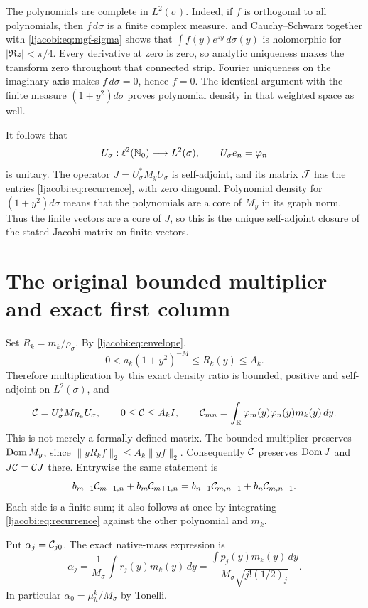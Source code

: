 The polynomials are complete in $L^2(\sigma)$. Indeed, if $f$ is
orthogonal to all polynomials, then $f\,d\sigma$ is a finite complex
measure, and Cauchy--Schwarz together with
\eqref{ljacobi:eq:mgf-sigma} shows that
$\int f(y)e^{zy}\,d\sigma(y)$ is holomorphic for $|\Re z|<\pi/4$.
Every derivative at zero is zero, so analytic uniqueness makes
the transform zero throughout that connected strip. Fourier
uniqueness on the imaginary axis makes $f\,d\sigma=0$, hence $f=0$.
The identical argument with the finite measure $(1+y^2)d\sigma$
proves polynomial density in that weighted space as well.

It follows that
\[
 U_\sigma:\ell^2(\mathbb N_0)\longrightarrow L^2(\sigma),\qquad
 U_\sigma e_n=\varphi_n
\]
is unitary. The operator $J=U_\sigma^*M_yU_\sigma$ is self-adjoint,
and its matrix $\mathcal J$ has the entries \eqref{ljacobi:eq:recurrence}, with zero
diagonal. Polynomial density for $(1+y^2)d\sigma$ means that the
polynomials are a core of $M_y$ in its graph norm. Thus the finite
vectors are a core of $J$, so this is the unique self-adjoint closure
of the stated Jacobi matrix on finite vectors.

\section{The original bounded multiplier and exact first column}

Set $R_k=m_k/\rho_\sigma$. By \eqref{ljacobi:eq:envelope},
\[
 0<a_k(1+y^2)^{-M}\leq R_k(y)\leq A_k.
\]
Therefore multiplication by this exact density ratio is bounded,
positive and self-adjoint on $L^2(\sigma)$, and
\begin{equation}\label{ljacobi:eq:operator}
 \mathcal C=U_\sigma^*M_{R_k}U_\sigma,\qquad
 0\leq\mathcal C\leq A_k I,\qquad
 \mathcal C_{mn}=\int_\mathbb R\varphi_m(y)\varphi_n(y)m_k(y)\,dy.
\end{equation}
This is not merely a formally defined matrix. The bounded multiplier
preserves $\operatorname{Dom} M_y$, since
$\|yR_k f\|_2\leq A_k\|yf\|_2$. Consequently $\mathcal C$ preserves
$\operatorname{Dom} J$ and $J\mathcal C=\mathcal C J$ there. Entrywise the same statement is
\[
 b_{m-1}\mathcal C_{m-1,n}+b_m\mathcal C_{m+1,n}
 =b_{n-1}\mathcal C_{m,n-1}+b_n\mathcal C_{m,n+1}.
\]
Each side is a finite sum; it also follows at once by integrating
\eqref{ljacobi:eq:recurrence} against the other polynomial and $m_k$.

Put $\alpha_j=\mathcal C_{j0}$. The exact native-mass expression is
\begin{equation}\label{ljacobi:eq:alpha-moment}
 \alpha_j=\frac1{M_\sigma}\int r_j(y)m_k(y)\,dy
 =\frac{\int p_j(y)m_k(y)\,dy}
             {M_\sigma\sqrt{j!(1/2)_j}}.
\end{equation}
In particular $\alpha_0=\mu_h^k/M_\sigma$ by Tonelli.

